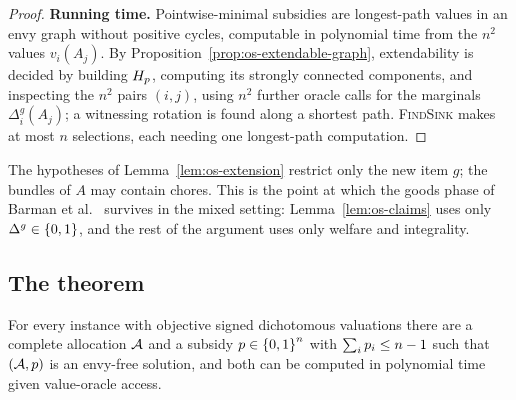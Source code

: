 \begin{proof}
\par\smallskip\noindent\textbf{Running time.} Pointwise-minimal subsidies are longest-path values in an
envy graph without positive cycles, computable in polynomial time from the
$n^2$ values $v_i(A_j)$. By Proposition~\ref{prop:os-extendable-graph},
extendability is decided by building $H_p$, computing its strongly
connected components, and inspecting the $n^2$ pairs $(i,j)$, using $n^2$
further oracle calls for the marginals $\Delta_i^g(A_j)$; a witnessing
rotation is found along a shortest path. \textsc{FindSink} makes at most $n$
selections, each needing one longest-path computation.
\end{proof}

The hypotheses of Lemma~\ref{lem:os-extension} restrict only the new item
$g$; the bundles of $A$ may contain chores. This is the point at which the
goods phase of Barman et al.~\cite{BKNS22} survives in the mixed setting:
Lemma~\ref{lem:os-claims} uses only $\Delta^g\in\left\{0,1\right\}$, and the rest of the
argument uses only welfare and integrality.

\subsection{The theorem}

\begin{theorem}
\label{thm:os-main}
For every instance with objective signed dichotomous valuations there are a
complete allocation $\mathcal{A}$ and a subsidy $p\in\left\{0,1\right\}^n$ with
$\sum_ip_i\le n-1$ such that $(\mathcal{A},p)$ is an envy-free
solution, and both can be computed in polynomial time given value-oracle
access.
\end{theorem}

